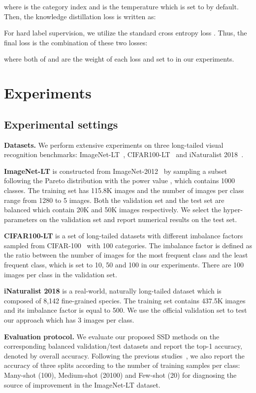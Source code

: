 \documentclass[10pt,twocolumn,letterpaper]{article}
\begin{document}
where  is the category index and  is the temperature which is set to  by default. Then, the knowledge distillation loss is written as:

For hard label supervision, we utilize the standard cross entropy loss . Thus, the final loss is the combination of these two losses:

where both of  and  are the weight of each loss and set to  in our experiments.


\section{Experiments}
\subsection{Experimental settings}
\label{subsec:exp_setting}
\noindent\textbf{Datasets.} We perform extensive experiments on three long-tailed visual recognition benchmarks: ImageNet-LT~\cite{OLTR}, CIFAR100-LT~\cite{LDAM} and iNaturalist 2018~\cite{iNat_dataset}.

\noindent \textbf{ImageNet-LT} is constructed from ImageNet-2012~\cite{ImageNet} by sampling a subset following the Pareto distribution with the power value , which contains 1000 classes. The training set has 115.8K images and the number of images per class range from 1280 to 5 images. Both the validation set and the test set are balanced which contain 20K and 50K images respectively. We select the hyper-parameters on the validation set and report numerical results on the test set.

\medskip
\noindent \textbf{CIFAR100-LT} is a set of long-tailed datasets with different imbalance factors sampled from CIFAR-100~\cite{cifar} with 100 categories. The imbalance factor is defined as the ratio between the number of images for the most frequent class and the least frequent class, which is set to 10, 50 and 100 in our experiments. There are 100 images per class in the validation set.

\medskip
\noindent \textbf{iNaturalist 2018} is a real-world, naturally long-tailed dataset which is composed of 8,142 fine-grained species. The training set contains 437.5K images and its imbalance factor is equal to 500. We use the official validation set to test our approach which has 3 images per class.

\medskip
\noindent\textbf{Evaluation protocol.} We evaluate our proposed SSD methods on the corresponding balanced validation/test datasets and report the top-1 accuracy, denoted by overall accuracy. Following the previous studies~\cite{OLTR}, we also report the accuracy of three splits according to the number of training samples per class: Many-shot (100), Medium-shot (20100) and Few-shot (20) for diagnosing the source of improvement in the ImageNet-LT dataset.
\end{document}
